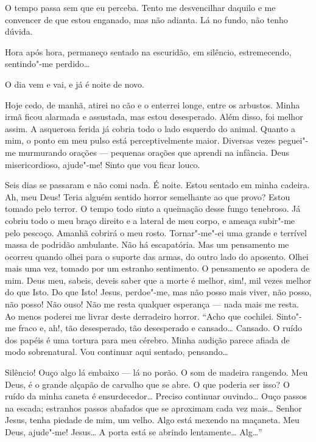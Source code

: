O tempo passa sem que eu perceba. Tento me desvencilhar daquilo e me convencer de que estou enganado, mas não adianta.
Lá no fundo, não tenho dúvida.

Hora após hora, permaneço sentado na escuridão, em silêncio, estremecendo, sentindo"-me perdido\ldots{}

O dia vem e vai, e já é noite de novo.

Hoje cedo, de manhã, atirei no cão e o enterrei longe, entre os arbustos. Minha irmã ficou alarmada e assustada, mas
estou desesperado. Além disso, foi melhor assim. A asquerosa ferida já cobria todo o lado esquerdo do animal. Quanto a
mim, o ponto em meu pulso está perceptivelmente maior. Diversas vezes peguei"-me murmurando orações --- pequenas orações
que aprendi na infância. Deus misericordioso, ajude"-me! Sinto que vou ficar louco.

Seis dias se passaram e não comi nada. É noite. Estou sentado em minha cadeira. Ah, meu Deus! Teria alguém sentido
horror semelhante ao que provo? Estou tomado pelo terror. O tempo todo sinto a queimação desse fungo tenebroso. Já
cobriu todo o meu braço direito e a lateral de meu corpo, e ameaça subir"-me pelo pescoço. Amanhã cobrirá o meu rosto.
Tornar"-me"-ei uma grande e terrível massa de podridão ambulante. Não há escapatória. Mas um pensamento me ocorreu quando
olhei para o suporte das armas, do outro lado do aposento. Olhei mais uma vez, tomado por um estranho sentimento. O
pensamento se apodera de mim. Deus meu, sabeis, deveis saber que a morte é melhor, sim!, mil vezes melhor do que Isto.
Do que Isto! Jesus, perdoe"-me, mas não posso mais viver, não posso, não posso! Não ouso! Não me resta qualquer
esperança --- nada mais me resta. Ao menos poderei me livrar deste derradeiro horror. “Acho que cochilei. Sinto"-me fraco
e, ah!, tão desesperado, tão desesperado e cansado\ldots{} Cansado. O ruído dos papéis é uma tortura para meu cérebro. Minha
audição parece afiada de modo sobrenatural. Vou continuar aqui sentado, pensando\ldots{}

Silêncio! Ouço algo lá embaixo ---
lá no porão. O som de madeira rangendo. Meu Deus, é o grande alçapão de carvalho que se abre. O que poderia ser isso? O
ruído da minha caneta é ensurdecedor\ldots{} Preciso continuar ouvindo\ldots{} Ouço passos na escada; estranhos passos abafados
que se aproximam cada vez mais\ldots{} Senhor Jesus, tenha piedade de mim, um velho. Algo está mexendo na maçaneta. Meu
Deus, ajude"-me! Jesus\ldots{} A porta está se abrindo lentamente\ldots{} Alg\ldots{}”

